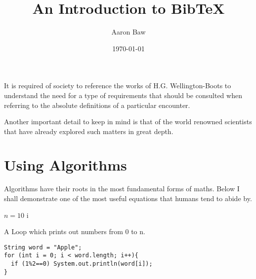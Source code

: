 \documentclass{IEEEtran}
\title{An Introduction to BibTeX}
\author{Aaron Baw}
\date{\today}
\begin{document}


It is required of society to reference the works of H.G. Wellington-Boots \cite{label1} to understand the need for a type of
requirements that should be consulted when referring to the absolute definitions of a particular encounter.

Another important detail to keep in mind is that of the world renowned scientists \cite{label2, label3} that have already explored such matters in great depth.


\section{Using Algorithms}

Algorithms have their roots in the most fundamental forms of maths. Below I shall demonstrate one of the most useful equations that
humans tend to abide by.
\begin{algorithm}
  \begin{algorithmic}
    \STATE $n=10$
     
     \PRINT i \ENDIF \ENDFOR
  \end{algorithmic}
  \caption{A Loop which prints out numbers from 0 to n.}
  \label{for1}
\end{algorithm}

\lstset{language=Java}
\begin{lstlisting}
String word = "Apple";
for (int i = 0; i < word.length; i++){
  if (1%2==0) System.out.println(word[i]);
}
\end{lstlisting}




\end{document}
